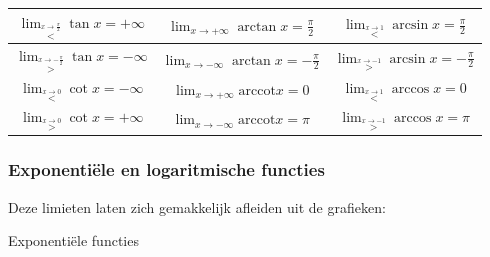 \begin{table}[ht]
	\centering
	\begin{tabular}{|c||c||c|}
		\hline 
		${\displaystyle \lim_{\overset{x\rightarrow\frac{\pi}{2}}{<}}}\tan x=+\infty$ & ${\displaystyle \lim_{x\rightarrow+\infty}}\arctan x=\frac{\pi}{2}$ & ${\displaystyle \lim_{\overset{x\rightarrow1}{<}}}\arcsin x=\frac{\pi}{2}$\\
		\hline 
		${\displaystyle \lim_{\overset{x\rightarrow-\frac{\pi}{2}}{>}}}\tan x=-\infty$ & ${\displaystyle \lim_{x\rightarrow-\infty}}\arctan x=-\frac{\pi}{2}$ & ${\displaystyle \lim_{\overset{x\rightarrow-1}{>}}}\arcsin x=-\frac{\pi}{2}$\\
		\hline 
		${\displaystyle \lim_{\overset{x\rightarrow0}{<}}}\cot x=-\infty$ & ${\displaystyle \lim_{x\rightarrow+\infty}}\mathrm{arccot}x=0$ & ${\displaystyle \lim_{\overset{x\rightarrow1}{<}}}\arccos x=0$\\
		\hline 
		${\displaystyle \lim_{\overset{x\rightarrow0}{>}}}\cot x=+\infty$  & ${\displaystyle \lim_{x\rightarrow-\infty}}\mathrm{arccot}x=\pi$ & ${\displaystyle \lim_{\overset{x\rightarrow-1}{>}}}\arccos x=\pi$\\
		\hline 
	\end{tabular}
\end{table}






\subsubsection{Exponenti\"ele en logaritmische functies}

Deze limieten laten zich gemakkelijk afleiden uit de grafieken:

Exponenti\"ele functies


